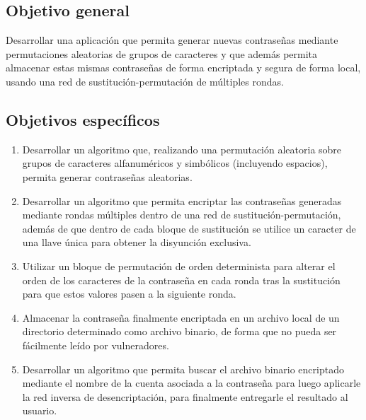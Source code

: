 \documentclass[a4paper]{article}
\begin{document}
\vspace{1cm}

\subsection*{Objetivo general}

Desarrollar una aplicación que permita generar nuevas contraseñas mediante permutaciones aleatorias de grupos de caracteres y que además permita almacenar estas mismas contraseñas de forma encriptada y segura de forma local, usando una red de sustitución-permutación de múltiples rondas.

\newpage

\subsection*{Objetivos específicos}

\begin{enumerate}
    \item Desarrollar un algoritmo que, realizando una permutación aleatoria sobre grupos de caracteres alfanuméricos y simbólicos (incluyendo espacios), permita generar contraseñas aleatorias.
    \item Desarrollar un algoritmo que permita encriptar las contraseñas generadas mediante rondas múltiples dentro de una red de sustitución-permutación, además de que dentro de cada bloque de sustitución se utilice un caracter de una llave única para obtener la disyunción exclusiva.
    \item Utilizar un bloque de permutación de orden determinista para alterar el orden de los caracteres de la contraseña en cada ronda tras la sustitución para que estos valores pasen a la siguiente ronda.
    \item Almacenar la contraseña finalmente encriptada en un archivo local de un directorio determinado como archivo binario, de forma que no pueda ser fácilmente leído por vulneradores.
    \item Desarrollar un algoritmo que permita buscar el archivo binario encriptado mediante el nombre de la cuenta asociada a la contraseña para luego aplicarle la red inversa de desencriptación, para finalmente entregarle el resultado al usuario.
\end{enumerate}
\end{document}
